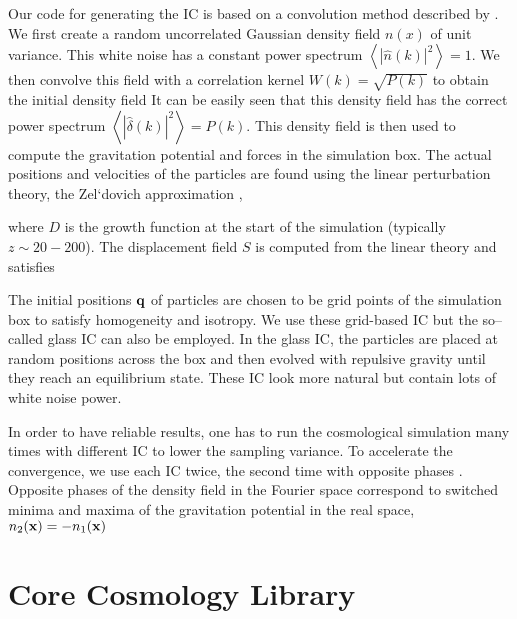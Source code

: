 Our code for generating the IC is based on a convolution method described by \textcite{1997ApJ...490L.127P}. We first create a random uncorrelated Gaussian density field $n(x)$ of unit variance. This white noise has a constant power spectrum $\left\langle|\hat n(k)|^2\right\rangle=1$. We then convolve this field with a correlation kernel $W(k)=\sqrt{P(k)}$ to obtain the initial  density field
It can be easily seen that this density field has the correct power spectrum $\left\langle|\hat\delta(k)|^2\right\rangle=P(k)$. This density field is then used to compute the gravitation potential and forces in the simulation box. The actual positions and velocities of the particles are found using the linear perturbation theory, the Zel`dovich approximation \parencite{1970A&A.....5...84Z},
\begin{sloppypar}
where $D$ is the growth function at the start of the simulation (typically ${z\sim20-200}$). The displacement field $S$ is computed from the linear theory and satisfies
\end{sloppypar}
The initial positions $\mathbf q$ of particles are chosen to be grid points of the simulation box to satisfy homogeneity and isotropy. We use these grid-based IC but the so--called glass IC can also be employed. In the glass IC, the particles are placed at random positions across the box and then evolved with repulsive gravity until they reach an equilibrium state. These IC look more natural but contain lots of white noise power.

In order to have reliable results, one has to run the cosmological simulation many times with different IC to lower the sampling variance. To accelerate the convergence, we use each IC twice, the second time with opposite phases \parencite{PhysRevD.93.103519}. Opposite phases of the density field in the Fourier space correspond to switched minima and maxima of the gravitation potential in the real space, $n_2(\mathbf x)=-n_1(\mathbf x)$

\section{Core Cosmology Library}

